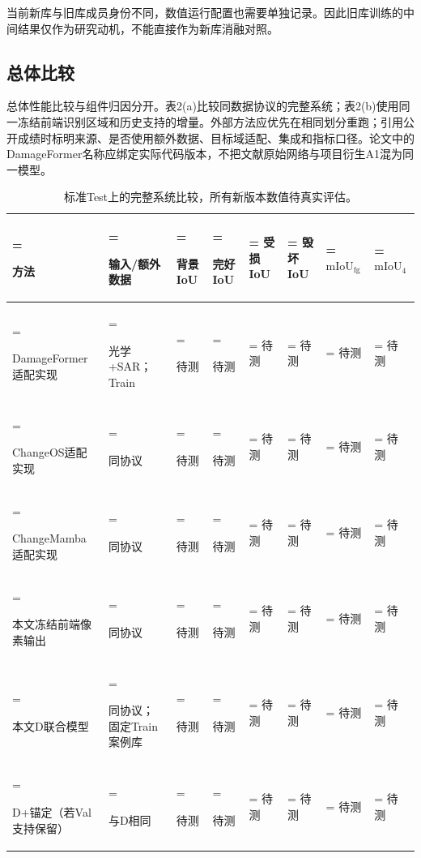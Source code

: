 \documentclass[UTF8,a4paper,zihao=-4,fontset=none]{ctexart}
\begin{document}
当前新库与旧库成员身份不同，数值运行配置也需要单独记录。因此旧库训练的中间结果仅作为研究动机，不能直接作为新库消融对照。

\FloatBarrier

\subsection{总体比较}

总体性能比较与组件归因分开。表2(a)比较同数据协议的完整系统；表2(b)使用同一冻结前端识别区域和历史支持的增量。外部方法应优先在相同划分重跑；引用公开成绩时标明来源、是否使用额外数据、目标域适配、集成和指标口径。论文中的DamageFormer名称应绑定实际代码版本，不把文献原始网络与项目衍生A1混为同一模型。

\begin{table}[!htbp]
\centering
\renewcommand{\thetable}{2(a)}
\caption{标准Test上的完整系统比较，所有新版本数值待真实评估。}
\label{tab:2a}
\small
\setlength{\tabcolsep}{3.5pt}
\renewcommand{\arraystretch}{1.3}
\begin{tabularx}{\linewidth}{@{}>{\hsize=2.100000\hsize\linewidth=\hsize\raggedright\arraybackslash}X>{\hsize=1.550000\hsize\linewidth=\hsize\raggedright\arraybackslash}X>{\hsize=0.725000\hsize\linewidth=\hsize\raggedright\arraybackslash}X>{\hsize=0.725000\hsize\linewidth=\hsize\raggedright\arraybackslash}X>{\hsize=0.725000\hsize\linewidth=\hsize\centering\arraybackslash}X>{\hsize=0.725000\hsize\linewidth=\hsize\centering\arraybackslash}X>{\hsize=0.725000\hsize\linewidth=\hsize\centering\arraybackslash}X>{\hsize=0.725000\hsize\linewidth=\hsize\centering\arraybackslash}X@{}}
\toprule
\textbf{方法} & \textbf{输入/额外数据} & \textbf{背景IoU} & \textbf{完好IoU} & \textbf{受损IoU} & \textbf{毁坏IoU} & \textbf{\(\mathrm{mIoU}_{\mathrm{fg}}\)} & \textbf{\(\mathrm{mIoU}_{4}\)} \\
\midrule
DamageFormer适配实现 & 光学+SAR；Train & 待测 & 待测 & 待测 & 待测 & 待测 & 待测 \\
ChangeOS适配实现 & 同协议 & 待测 & 待测 & 待测 & 待测 & 待测 & 待测 \\
ChangeMamba适配实现 & 同协议 & 待测 & 待测 & 待测 & 待测 & 待测 & 待测 \\
本文冻结前端像素输出 & 同协议 & 待测 & 待测 & 待测 & 待测 & 待测 & 待测 \\
本文D联合模型 & 同协议；固定Train案例库 & 待测 & 待测 & 待测 & 待测 & 待测 & 待测 \\
D+锚定（若Val支持保留） & 与D相同 & 待测 & 待测 & 待测 & 待测 & 待测 & 待测 \\
\bottomrule
\end{tabularx}
\end{table}
\end{document}
